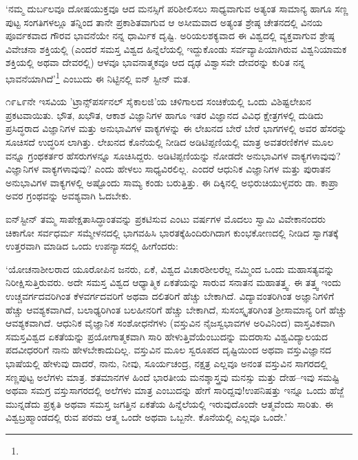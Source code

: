 ‘ನಮ್ಮ ದುರ್ಬಲವೂ ದೋಷಯುಕ್ತವೂ ಆದ ಮನಸ್ಸಿಗೆ ಪರಿಶೀಲಿಸಲು ಸಾಧ್ಯವಾಗುವ ಅತ್ಯಂತ ಸಾಮಾನ್ಯ ಹಾಗೂ ಸಣ್ಣ ಪುಟ್ಟ ಸಂಗತಿಗಳಲ್ಲೂ ತನ್ನಿಂದ ತಾನೇ ಪ್ರಕಾಶಿತವಾಗುವ ಆ ಅಸೀಮವಾದ ಅತ್ಯಂತ ಶ್ರೇಷ್ಠ ಚೇತನದಲ್ಲಿ ವಿನಯ ಪೂರ್ವಕವಾದ ಗೌರವ ಭಾವನೆಯೇ ನನ್ನ ಧಾರ್ಮಿಕ ದೃಷ್ಟಿ. ಅರಿಯಲಶಕ್ಯವಾದ ಈ ವಿಶ್ವದಲ್ಲಿ ವ್ಯಕ್ತವಾಗುವ ಶ್ರೇಷ್ಠ ವಿವೇಚನಾ ಶಕ್ತಿಯಲ್ಲಿ (ಎಂದರೆ ಸಮಸ್ತ ವಿಶ್ವದ ಹಿನ್ನೆಲೆಯಲ್ಲಿ ಇದ್ದುಕೊಂಡು ಸರ್ವವ್ಯಾಪಿಯಾಗಿರುವ ವಿಶ್ವನಿಯಾಮಕ ಶಕ್ತಿಯಲ್ಲಿ ಅಥವಾ ದೇವರಲ್ಲಿ) ಆಳವೂ ಭಾವನಾತ್ಮಕವೂ ಆದ ದೃಢ ವಿಶ್ವಾಸವೇ ದೇವರನ್ನು ಕುರಿತ ನನ್ನ ಭಾವನೆಯಾಗಿದೆ'\footnote{\hfill{}} ಎಂಬುದು ಈ ನಿಟ್ಟಿನಲ್ಲಿ ಐನ್ ಸ್ಟೀನ್ ಮತ.

೧೯೬೯ನೇ ಇಸವಿಯ 'ಟ್ರಾನ್ಸ್​ಪರ್ಸನಲ್ ಸೈಕಾಲಜಿ’ಯ ಚಳಿಗಾಲದ ಸಂಚಿಕೆಯಲ್ಲಿ ಒಂದು ವಿಶಿಷ್ಟಲೇಖನ ಪ್ರಕಟವಾಯಿತು. ಭೌತ, ಖಭೌತ, ಆಕಾಶ ವಿಜ್ಞಾನಿಗಳ ಹಾಗೂ ಇತರ ವಿಜ್ಞಾನದ ವಿವಿಧ ಕ್ಷೇತ್ರಗಳಲ್ಲಿ ದುಡಿದು ಪ್ರಸಿದ್ಧರಾದ ವಿಜ್ಞಾನಿಗಳ ಮತ್ತು ಅನುಭಾವಿಗಳ ವಾಕ್ಯಗಳನ್ನು ಈ ಲೇಖನದ ಬೇರೆ ಬೇರೆ ಭಾಗಗಳಲ್ಲಿ ಅವರ ಹೆಸರನ್ನು ಸೂಚಿಸದೆ ಉದ್ಧರಿಸ ಲಾಗಿತ್ತು. ಲೇಖನದ ಕೊನೆಯಲ್ಲಿ ನೀಡಿದ ಅಡಿಟಿಪ್ಪಣಿಯಲ್ಲಿ ಮಾತ್ರ ಅವತರಣಿಕೆಗಳ ಮೂಲ ವನ್ನೂ ಗ್ರಂಥಕರ್ತರ ಹೆಸರುಗಳನ್ನೂ ಸೂಚಿಸಿದ್ದರು. ಅಡಿಟಿಪ್ಪಣಿಯನ್ನು ನೋಡದೇ ಅನುಭಾವಿಗಳ ವಾಕ್ಯಗಳಾವುವು? ವಿಜ್ಞಾನಿಗಳ ವಾಕ್ಯಗಳಾವುವು? ಎಂದು ಹೇಳಲು ಸಾಧ್ಯವಿರಲಿಲ್ಲ. ಎಂದರೆ ಆಧುನಿಕ ವಿಜ್ಞಾನಿಗಳ ಮತ್ತು ಪುರಾತನ ಅನುಭಾವಿಗಳ ವಾಕ್ಯಗಳಲ್ಲಿ ಅಷ್ಟೊಂದು ಸಾಮ್ಯ ಕಂಡು ಬರುತ್ತಿತ್ತು. ಈ ದಿಕ್ಕಿನಲ್ಲಿ ಅಭಿರುಚಿಯುಳ್ಳವರು ಡಾ. ಕಾಪ್ರಾ ಅವರ ಗ್ರಂಥವನ್ನು ಅವಶ್ಯವಾಗಿ ಓದಬೇಕು.

ಐನ್​ಸ್ಟೀನ್ ತಮ್ಮ ಸಾಪೇಕ್ಷತಾಸಿದ್ಧಾಂತವನ್ನು ಪ್ರಕಟಿಸುವ ಎಂಟು ವರ್ಷಗಳ ಮೊದಲು ಸ್ವಾಮಿ ವಿವೇಕಾನಂದರು ಚಿಕಾಗೋ ಸರ್ವಧರ್ಮ ಸಮ್ಮೇಳನದಲ್ಲಿ ಭಾಗವಹಿಸಿ ಭಾರತಕ್ಕೆ\break ಹಿಂದಿರುಗಿದಾಗ ಕುಂಭಕೋಣದಲ್ಲಿ ನೀಡಿದ ಸ್ವಾಗತಕ್ಕೆ ಉತ್ತರವಾಗಿ ಮಾಡಿದ ಒಂದು ಉಪನ್ಯಾಸದಲ್ಲಿ ಹೀಗೆಂದರು:

‘ಯೋಚನಾಶೀಲರಾದ ಯೂರೋಪಿನ ಜನರು, ಏಕೆ, ವಿಶ್ವದ ವಿಚಾರಶೀಲರೆಲ್ಲ ನಮ್ಮಿಂದ ಒಂದು ಮಹಾಸತ್ಯವನ್ನು ನಿರೀಕ್ಷಿಸುತ್ತಿರುವರು. ಅದೇ ಸಮಸ್ತ ವಿಶ್ವದ ಆಧ್ಯಾತ್ಮಿಕ ಏಕತೆಯನ್ನು ಸಾರುವ ಸನಾತನ ಮಹಾತತ್ತ್ವ. ಈ ತತ್ತ್ವ ಇಂದು ಉಚ್ಚವರ್ಗದವರಿಗಿಂತ ಕೆಳವರ್ಗದವರಿಗೆ ಅಥವಾ ದಲಿತರಿಗೆ ಹೆಚ್ಚು ಬೇಕಾಗಿದೆ. ವಿದ್ಯಾವಂತರಿಗಿಂತ ಅಜ್ಞಾನಿಗಳಿಗೆ ಹೆಚ್ಚು ಆವಶ್ಯಕವಾಗಿದೆ, ಬಲಾಢ್ಯರಿಗಿಂತ ಬಲಹೀನರಿಗೆ ಹೆಚ್ಚು ಬೇಕಾಗಿದೆ, ಸುಸಂಸ್ಕೃತರಿಗಿಂತ ಶ‍್ರೀಸಾಮಾನ್ಯ ರಿಗೆ ಹೆಚ್ಚು ಆವಶ್ಯಕವಾಗಿದೆ. ಆಧುನಿಕ ವೈಜ್ಞಾನಿಕ ಸಂಶೋಧನೆಗಳು (ವಸ್ತುವಿನ ನೈಜಸ್ವಭಾವಗಳ ಅರಿವಿನಿಂದ) ವಾಸ್ತವಿಕವಾಗಿ ಸಮಸ್ತವಿಶ್ವದ ಏಕತೆಯನ್ನು ಪ್ರಯೋಗಾತ್ಮಕವಾಗಿ ಸಾರಿ ಹೇಳುತ್ತಿವೆಯೆಂಬು\-ದನ್ನು ಮದರಾಸು ವಿಶ್ವವಿದ್ಯಾಲಯದ ಪದವೀಧರರಿಗೆ ನಾನು ಹೇಳಬೇಕಾದುದಿಲ್ಲ. ವಸ್ತುವಿನ ಮೂಲ ಸ್ವರೂಪದ ದೃಷ್ಟಿಯಿಂದ ಅಥವಾ ವಸ್ತುವಿಜ್ಞಾನದ ಭಾಷೆಯಲ್ಲಿ ಹೇಳುವು ದಾದರೆ, ನಾನು, ನೀವು, ಸೂರ್ಯಚಂದ್ರ, ನಕ್ಷತ್ರ ಎಲ್ಲವೂ ಅನಂತ ವಸ್ತುವಿನ ಸಾಗರದಲ್ಲಿ ಸಣ್ಣಪುಟ್ಟ ಅಲೆಗಳು ಮಾತ್ರ. ಶತಮಾನಗಳ ಹಿಂದೆ ಭಾರತೀಯ ಮನಶ್ಶಾಸ್ತ್ರವು ಮನಸ್ಸು ಮತ್ತು ದೇಹ–ಇವು ಸಮಷ್ಟಿ ಅಥವಾ ಸಮಗ್ರ ವಸ್ತುಸಾಗರದಲ್ಲಿ ಅಲೆಗಳು ಮಾತ್ರ ಎಂಬುದನ್ನು ಹೇಗೆ ಸಾರಿದ್ದವು!ಉಪನಿಷತ್ತು ಇನ್ನೂ ಒಂದು ಹೆಜ್ಜೆ ಮುನ್ನಡೆದು ಪ್ರಕೃತಿ ಅಥವಾ ಸಮಸ್ತ ಜಗತ್ತಿನ ಏಕತೆಯ ಹಿನ್ನೆಲೆಯಲ್ಲಿ ಇರುವುದೊಂದೇ ಆತ್ಮವೆಂದು ಸಾರಿತು. ಈ ವಿಶ್ವಬ್ರಹ್ಮಾಂಡದಲ್ಲಿ ರುವ ಪರಮ ಆತ್ಮ ಒಂದೇ ಅಥವಾ ಒಬ್ಬನೇ. ಕೊನೆಯಲ್ಲಿ ಎಲ್ಲವೂ ಒಂದೇ.’

